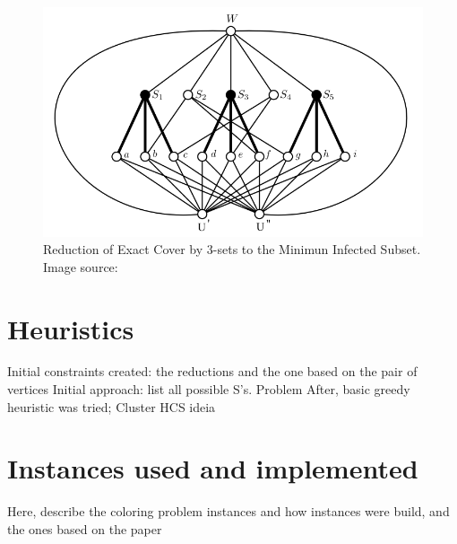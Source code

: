 \begin{figure}
\includegraphics[width=14cm]{img/Figure6-1.png}
\caption{Reduction of Exact Cover by 3-sets to the Minimun Infected Subset. Image source: \cite{Araujo2018}}
\label{fig:reduction}
\end{figure}



\section{Heuristics}
Initial constraints created: the reductions and the one based on the pair of vertices
Initial approach: list all possible S's. Problem 
After, basic greedy heuristic was tried;
Cluster HCS ideia

\section{Instances used and implemented}
Here, describe the coloring problem instances and how instances were build, and the ones based on the paper \citet{raghavan2015}
